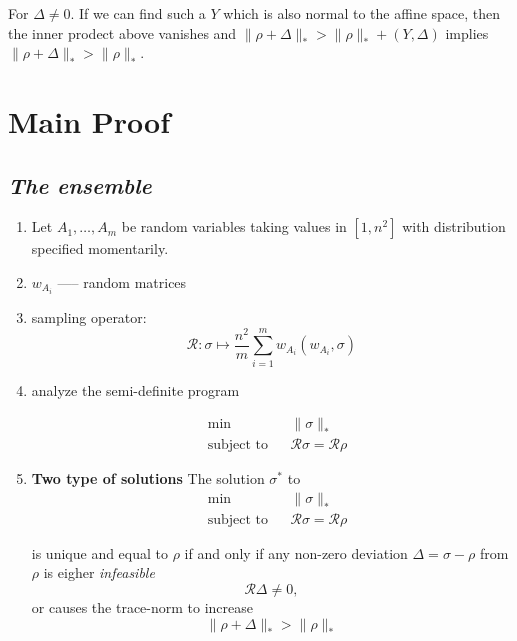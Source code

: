 \documentclass{article}
\begin{document}
For $\Delta \neq 0$. If we can find such a $Y$ which is also normal to the affine space, then the inner prodect above vanishes and $\|\rho + \Delta\|_* > \|\rho\|_* + (Y, \Delta)$ implies $\|\rho + \Delta\|_* > \|\rho\|_*$.

\section{Main Proof}
\subsection{\textit{The ensemble}}
\begin{enumerate}
\item Let $A_1,\dots,A_m$ be random variables taking values in $[1,n^2]$ with distribution {\color{red}specified momentarily}.

\item $w_{A_i}$ ----- random matrices

\item sampling operator: 
\begin{equation}
\mathcal{R}: \sigma \mapsto \dfrac{n^2}{m}\sum_{i=1}^{m} w_{A_i}( w_{A_i},\sigma)
\label{eq:7}
\end{equation}

\item analyze the semi-definite program

\begin{equation}
\begin{aligned}
&\text{min} 
& &  \|\sigma\|_*\\
&\text{subject to} 
& & \mathcal{R}\sigma = \mathcal{R}\rho
\end{aligned}
\label{eq:8}
\end{equation}

\item \textbf{Two type of solutions} The solution $\sigma^*$ to 
\begin{equation}
\begin{aligned}
&\text{min} 
&    &  \|\sigma\|_*\\
&\text{subject to} 
&     &\mathcal{R}\sigma = \mathcal{R}\rho
\end{aligned}
\label{eq:9}
\end{equation}

is unique and equal to $\rho$ if and only if any non-zero deviation $\Delta = \sigma - \rho$ from $\rho$ is eigher \textit{infeasible}
\begin{equation}
\mathcal{R}\Delta \neq 0,
\label{eq:10}
\end{equation}
or causes the trace-norm to increase
\begin{equation}
\|\rho+\Delta\|_* > \|\rho\|_*
\label{eq:11}
\end{equation}



\end{enumerate}
\end{document}
